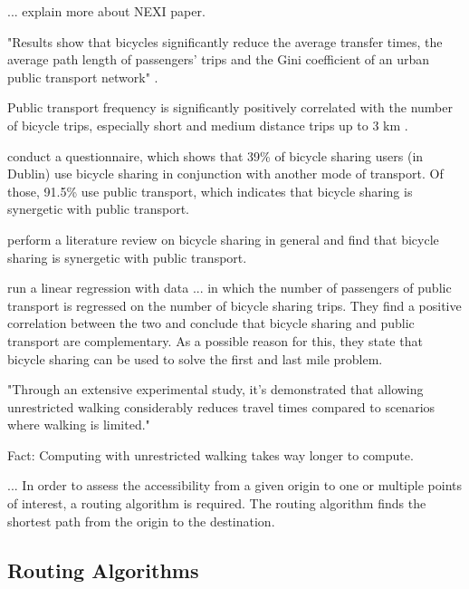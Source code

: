 ... explain more about NEXI paper.




"Results show that bicycles significantly reduce the average transfer times, the average path length of passengers’ trips and the Gini coefficient of an urban public transport network" \cite{yangImpactPublicBicyclesharing2018}.

Public transport frequency is significantly positively correlated with the number of bicycle trips, especially short and medium distance trips up to 3 km \cite{radzimskiExploringRelationshipBikesharing2021a}.

\cite{murphyRoleBicyclesharingCity2015} conduct a questionnaire, which shows that 39\% of bicycle sharing users (in Dublin) use bicycle sharing in conjunction with another mode of transport. Of those, 91.5\% use public transport, which indicates that bicycle sharing is synergetic with public transport.

\cite{fishmanBikeShareSynthesis2013} perform a literature review on bicycle sharing in general and find that bicycle sharing is synergetic with public transport.

\cite{maBicycleSharingPublic2015} run a linear regression with data ...
in which the number of passengers of public transport is regressed on the number of bicycle sharing trips.
They find a positive correlation between the two and conclude that bicycle sharing and public transport are complementary.
As a possible reason for this, they state that bicycle sharing can be used to solve the first and last mile problem.

"Through an extensive experimental study, it's demonstrated that allowing unrestricted walking considerably reduces travel times compared to scenarios where walking is limited." \cite{wagnerPublicTransitRouting2017}

Fact: Computing with unrestricted walking takes way longer to compute. \cite{wagnerPublicTransitRouting2017}


...
In order to assess the accessibility from a given origin to one or multiple
points of interest, a routing algorithm is required. The routing algorithm finds
the shortest path from the origin to the destination.

\subsection{Routing Algorithms}
\label{subsec:routing_algorithms}

